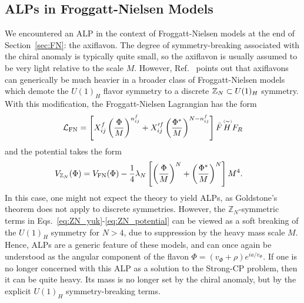 {\subsection{ALPs in Froggatt-Nielsen Models}\label{sec:FN_ALP}

We encountered an ALP in the context of Froggatt-Nielsen models at the end of Section~\ref{sec:FN}: the axiflavon. The degree of symmetry-breaking associated with the chiral anomaly is typically quite small, so the axiflavon is usually assumed to be very light relative to the scale $M$. However, Ref.~\cite{Greljo:2024evt} points out that axiflavons can generically be much heavier in a broader class of Froggatt-Nielsen models which demote the $U(1)_H$ flavor symmetry to a discrete ${\Bbb Z}_N\subset U(1)_H$ symmetry. With this modification, the Froggatt-Nielsen Lagrangian has the form
\begin{align}
    {\cal L}_{\rm FN} = \left[X^f_{ij}\left(\frac{\Phi}{M}\right)^{n_{ij}^f}+X^{\prime f}_{ij}\left(\frac{\Phi^*}{M}\right)^{N - n_{ij}^f}\right]\bar{F}\overset{\tiny{\scriptscriptstyle \, (\sim)}}{H}F_R \label{eq:ZN_yuk}
\end{align}
and the potential takes the form
\begin{align}
    V_{{\mathbb Z}_N}(\Phi) &= V_{\rm FN}(\Phi) - \frac{1}{4}\lambda_N\left[\left(\frac{\Phi}{M}\right)^N + \left(\frac{\Phi^*}{M}\right)^N\right]M^4. \label{eq:ZN_potential}
\end{align}
In this case, one might not expect the theory to yield ALPs, as Goldstone's theorem does not apply to discrete symmetries. However, the ${\mathbb Z}_N$-symmetric terms in Eqs.~\ref{eq:ZN_yuk}-\ref{eq:ZN_potential} can be viewed as a soft breaking of the $U(1)_H$ symmetry for $N > 4$, due to suppression by the heavy mass scale $M$. Hence, ALPs are a generic feature of these models, and can once again be understood as the angular component of the flavon $\Phi = (v_\Phi + \rho) e^{ia/v_\Phi}$. If one is no longer concerned with this ALP as a solution to the Strong-CP problem, then it can be quite heavy. Its mass is no longer set by the chiral anomaly, but by the explicit $U(1)_H$ symmetry-breaking terms.

}
